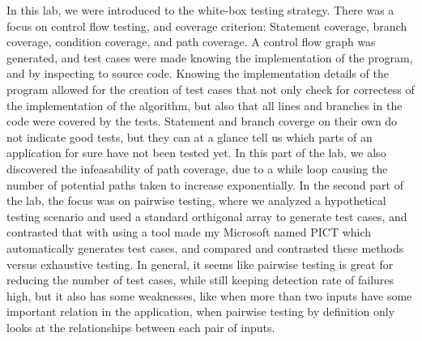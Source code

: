 In this lab, we were introduced to the white-box testing strategy. There was a
focus on control flow testing, and coverage criterion: Statement coverage,
branch coverage, condition coverage, and path coverage. A control flow graph
was generated, and test cases were made knowing the implementation of the
program, and by inspecting to source code. Knowing the implementation details
of the program allowed for the creation of test cases that not only check for
correctess of the implementation of the algorithm, but also that all lines and
branches in the code were covered by the tests. Statement and branch coverge on
their own do not indicate good tests, but they can at a glance tell us which
parts of an application for sure have not been tested yet. In this part of the
lab, we also discovered the infeasability of path coverage, due to a while loop
causing the number of potential paths taken to increase exponentially. In the
second part of
the lab, the focus was on pairwise testing, where we analyzed a hypothetical
testing scenario and used a standard orthigonal array to generate test cases,
and contrasted that with using a tool made my Microsoft named PICT which
automatically generates test cases, and compared and contrasted these methods
versus exhaustive testing. In general, it seems like pairwise testing is great
for reducing the number of test cases, while still keeping detection rate of
failures high, but it also has some weaknesses, like when more than two inputs
have some important relation in the application, when pairwise testing by
definition only looks at the relationships between each pair of inputs.

